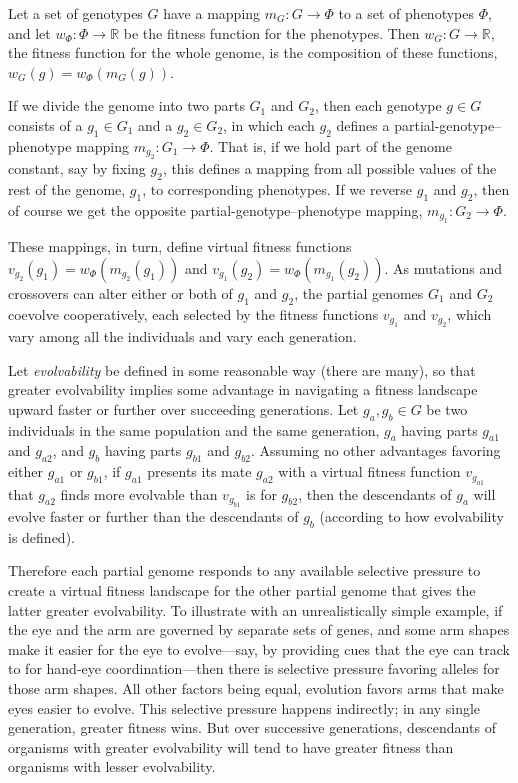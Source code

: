 \documentclass[letterpaper]{article}
\begin{document}
Let a set of genotypes $G$ have a mapping $m_{G} : G \rightarrow \Phi$ to a set
of phenotypes $\Phi$, and let $w_\Phi : \Phi \rightarrow \mathbb{R}$ be the
fitness function for the phenotypes. Then $w_G : G \rightarrow \mathbb{R}$, the
fitness function for the whole genome, is the composition of these functions,
$w_G(g) = w_\Phi(m_{G}(g))$.

If we divide the genome into two parts $G_1$ and $G_2$, then each genotype $g
\in G$ consists of a $g_1 \in G_1$ and a $g_2 \in G_2$, in which each $g_2$
defines a partial-genotype--phenotype mapping $m_{g_2} : G_1 \rightarrow
\Phi$. That is, if we hold part of the genome constant, say by fixing $g_2$,
this defines a mapping from all possible values of the rest of the genome,
$g_1$, to corresponding phenotypes. If we reverse $g_1$ and $g_2$, then of
course we get the opposite partial-genotype--phenotype mapping, $m_{g_1} : G_2
\rightarrow \Phi$.

These mappings, in turn, define virtual fitness functions $v_{g_2}(g_1) =
w_\Phi(m_{g_2}(g_1))$ and $v_{g_1}(g_2) = w_\Phi(m_{g_1}(g_2))$. As mutations
and crossovers can alter either or both of $g_1$ and $g_2$, the partial
genomes $G_1$ and $G_2$ coevolve cooperatively, each selected by
the fitness functions $v_{g_1}$ and $v_{g_2}$, which vary among all the
individuals and vary each generation.

Let \textit{evolvability} be defined in some reasonable way (there are many),
so that greater evolvability implies some advantage in navigating a fitness
landscape upward faster or further over succeeding generations. Let $g_a,g_b
\in G$ be two individuals in the same population and the same generation,
$g_a$ having parts $g_{a1}$ and $g_{a2}$, and $g_b$ having parts $g_{b1}$ and
$g_{b2}$.  Assuming no other advantages favoring either $g_{a1}$ or $g_{b1}$,
if $g_{a1}$ presents its mate $g_{a2}$ with a virtual fitness function
$v_{g_{a1}}$ that $g_{a2}$ finds more evolvable than $v_{g_{b1}}$ is for
$g_{b2}$, then the descendants of $g_a$ will evolve faster or further than the
descendants of $g_b$ (according to how evolvability is defined).

Therefore each partial genome responds to any available selective pressure to
create a virtual fitness landscape for the other partial genome that gives the
latter greater evolvability. To illustrate with an unrealistically simple
example, if the eye and the arm are governed by separate sets of genes, and
some arm shapes make it easier for the eye to evolve---say, by providing cues
that the eye can track to for hand-eye coordination---then there is selective
pressure favoring alleles for those arm shapes. All other factors being equal,
evolution favors arms that make eyes easier to evolve. This selective pressure
happens indirectly; in any single generation, greater fitness wins. But over
successive generations, descendants of organisms with greater evolvability
will tend to have greater fitness than organisms with lesser evolvability.
\end{document}
